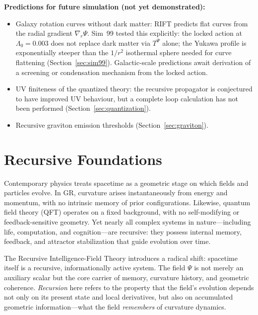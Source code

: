 \documentclass[12pt,a4paper]{article}
\begin{document}
\noindent\textbf{Predictions for future simulation (not yet demonstrated):}
\begin{itemize}
  \item Galaxy rotation curves without dark matter: RIFT predicts flat curves
        from the radial gradient $\nabla_r\Psi$. Sim~99 tested this explicitly:
        the locked action at $\Lambda_0 = 0.003$ does not replace dark matter via
        $T^{\Psi}$ alone; the Yukawa profile is exponentially steeper than the
        $1/r^2$ isothermal sphere needed for curve flattening
        (Section~\ref{sec:sim99}). Galactic-scale predictions await derivation
        of a screening or condensation mechanism from the locked action.
  \item UV finiteness of the quantized theory: the recursive propagator is
        conjectured to have improved UV behaviour, but a complete loop calculation
        has not been performed (Section~\ref{sec:quantization}).
  \item Recursive graviton emission thresholds (Section~\ref{sec:graviton}).
\end{itemize}

\section{Recursive Foundations}
\label{sec:foundations}

Contemporary physics treats spacetime as a geometric stage on which
fields and particles evolve. In GR, curvature arises instantaneously
from energy and momentum, with no intrinsic memory of prior configurations.
Likewise, quantum field theory (QFT) operates on a fixed background,
with no self-modifying or feedback-sensitive geometry. Yet nearly all
complex systems in nature---including life, computation, and cognition---are
recursive: they possess internal memory, feedback, and attractor
stabilization that guide evolution over time.

The Recursive Intelligence-Field Theory introduces a radical shift:
spacetime itself is a recursive, informationally active system. The
field $\Psi$ is not merely an auxiliary scalar but the core carrier of
memory, curvature history, and geometric coherence. \emph{Recursion}
here refers to the property that the field's evolution depends not only
on its present state and local derivatives, but also on accumulated
geometric information---what the field \emph{remembers} of curvature dynamics.
\end{document}

